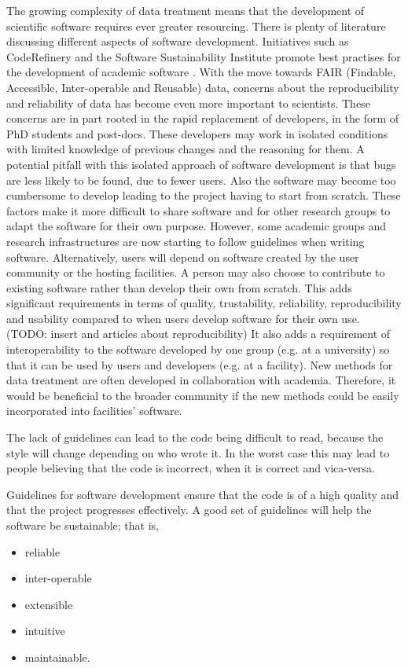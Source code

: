 \documentclass[jnr]{iosart2x}
\begin{document}
The growing complexity of data treatment means that the development of scientific software requires ever greater resourcing.
There is plenty of literature discussing different aspects of software development.
Initiatives such as CodeRefinery \cite{coderefinery} and the Software Sustainability Institute \cite{SoftwareSustainabilityInstitute} promote best practises for the development of academic software \cite{fair_software}.
With the move towards FAIR (Findable, Accessible, Inter-operable and Reusable) \cite{panosc} data, concerns about the reproducibility and reliability of data has become even more important to scientists.
These concerns are in part rooted in the rapid replacement of developers, in the form of PhD students and post-docs.
These developers may work in isolated conditions with limited knowledge of previous changes and the reasoning for them.
A potential pitfall with this isolated approach of software development is that bugs are less likely to be found, due to fewer users.
Also the software may become too cumbersome to develop leading to the project having to start from scratch.
These factors make it more difficult to share software and for other research groups to adapt the software for their own purpose.
However, some academic groups and research infrastructures are now starting to follow guidelines when writing software.
Alternatively, users will depend on software created by the user community or the hosting facilities.
A person may also choose to contribute to existing software rather than develop their own from scratch.
This adds significant requirements in terms of quality, trustability, reliability, reproducibility and usability compared to when users develop software for their own use.
(TODO: insert \cite{computational-science-error} and articles about reproducibility)
It also adds a requirement of interoperability to the software developed by one group (e.g. at a university) so that it can be used by users and developers (e.g. at a facility).
New methods for data treatment are often developed in collaboration with academia.
Therefore, it would be beneficial to the broader community if the new methods could be easily incorporated into facilities' software.

The lack of guidelines can lead to the code being difficult to read, because the style will change depending on who wrote it.
In the worst case this may lead to people believing that the code is incorrect, when it is correct and vica-versa.

Guidelines for software development ensure that the code is of a high quality and that the project progresses effectively.
A good set of guidelines will help the software be sustainable; that is,
\begin{itemize}
\item{reliable}
\item{inter-operable}
\item{extensible}
\item{intuitive}
\item{maintainable.}
\end{itemize}
\end{document}
